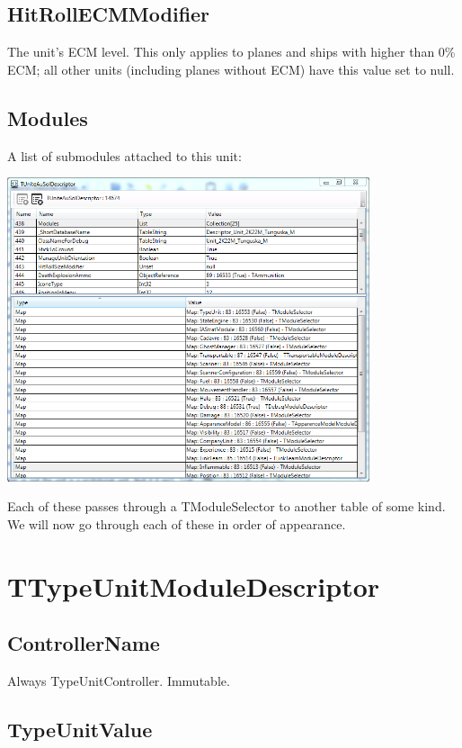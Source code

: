 \documentclass{article}
\begin{document}
\subsection{HitRollECMModifier}

The unit's ECM level. This only applies to planes and ships with higher than 0\% ECM; all other units (including planes without ECM) have this value set to null.

\subsection{Modules}

A list of submodules attached to this unit:


\includegraphics[width=0.8\textwidth]{screenshot_modules}

Each of these passes through a TModuleSelector to another table of some kind. We will now go through each of these in order of appearance.

\section{TTypeUnitModuleDescriptor}

\subsection{ControllerName}

Always TypeUnitController. Immutable.

\subsection{TypeUnitValue}
\end{document}
